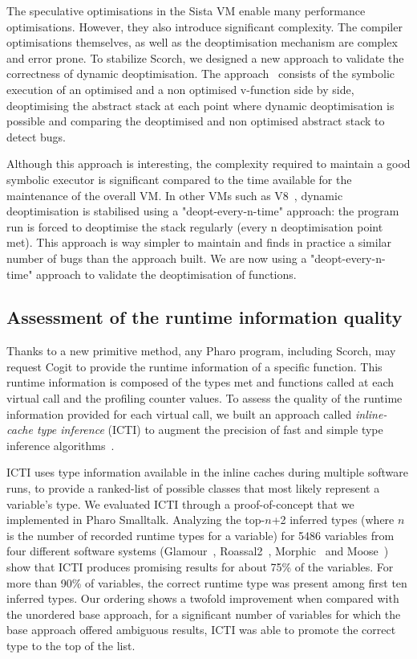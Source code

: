\documentclass[a4paper,12pt,twoside]{../includes/ThesisStyle}
\begin{document}
The speculative optimisations in the Sista VM enable many performance optimisations. However, they also introduce significant complexity. The compiler optimisations themselves, as well as the deoptimisation mechanism are complex and error prone. To stabilize Scorch, we designed a new approach to validate the correctness of dynamic deoptimisation. The approach~\cite{Bera16a} consists of the symbolic execution of an optimised and a non optimised v-function side by side, deoptimising the abstract stack at each point where dynamic deoptimisation is possible and comparing the deoptimised and non optimised abstract stack to detect bugs. 

Although this approach is interesting, the complexity required to maintain a good symbolic executor is significant compared to the time available for the maintenance of the overall VM. In other VMs such as V8~\cite{V8}, dynamic deoptimisation is stabilised using a "deopt-every-n-time" approach: the program run is forced to deoptimise the stack regularly (every n deoptimisation point met). This approach is way simpler to maintain and finds in practice a similar number of bugs than the approach built. We are now using a "deopt-every-n-time" approach to validate the deoptimisation of functions.

\subsection{Assessment of the runtime information quality}

Thanks to a new primitive method, any Pharo program, including Scorch, may request Cogit to provide the runtime information of a specific function. This runtime information is composed of the types met and functions called at each virtual call and the profiling counter values. To assess the quality of the runtime information provided for each virtual call, we built an approach called \emph{inline-cache type inference} (ICTI) to augment the precision of fast and simple type inference algorithms~\cite{Milo16a}. 

ICTI uses type information available in the inline caches during multiple software runs, to provide a ranked-list of possible classes that most likely represent a variable's type. We evaluated ICTI through a proof-of-concept that we implemented in Pharo Smalltalk. Analyzing the top-$n$+2 inferred types (where $n$ is the number of recorded runtime types for a variable) for 5486 variables from four different software systems (Glamour~\cite{Bung09a}, Roassal2~\cite{Pena13a}, Morphic~\cite{Fern07y} and Moose~\cite{Girb10a, Duca05a, Duca00b}) show that ICTI produces promising results for about 75\% of the variables. For more than 90\% of variables, the correct runtime type was present among first ten inferred types. Our ordering shows a twofold improvement when compared with the unordered base approach, \ie for a significant number of variables for which the base approach offered ambiguous results, ICTI was able to promote the correct type to the top of the list.
\end{document}
